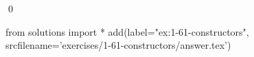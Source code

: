 
\begin{ex}
  \label{ex:1-61-constructors}
  
  \qed
\end{ex}
\begin{python0}
from solutions import *
add(label="ex:1-61-constructors",
    srcfilename='exercises/1-61-constructors/answer.tex')
\end{python0}
